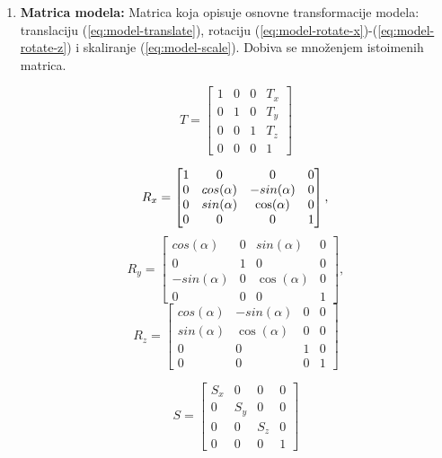 \begin{enumerate}
\item \textbf{Matrica modela:} Matrica koja opisuje osnovne transformacije modela: translaciju (\ref{eq:model-translate}), rotaciju (\ref{eq:model-rotate-x})-(\ref{eq:model-rotate-z}) i skaliranje (\ref{eq:model-scale}). Dobiva se množenjem istoimenih matrica.

\begin{equation}
\label{eq:model-translate}
	T = 
	\begin{bmatrix}
		1 & 0 & 0 & T_x\\
		0 & 1 & 0 & T_y\\
		0 & 0 & 1 & T_z\\
		0 & 0 & 0 & 1
	\end{bmatrix}
\end{equation}

\begin{equation}
\label{eq:model-rotate-x}
	R_x = 
	\begin{bmatrix}
		1 & 0 & 0 & 0\\
		0 & cos(\alpha) & -sin(\alpha) & 0\\
		0 & sin(\alpha) & \cos(\alpha) & 0\\
		0 & 0 & 0 & 1
	\end{bmatrix},\\
\end{equation}
\begin{equation}
\label{eq:model-rotate-y}
	R_y = 
	\begin{bmatrix}
		cos(\alpha) & 0 & sin(\alpha) & 0\\
		0 & 1 & 0 & 0\\
		-sin(\alpha) & 0 & \cos(\alpha) & 0\\
		0 & 0 & 0 & 1
	\end{bmatrix},
\end{equation}
\begin{equation}
\label{eq:model-rotate-z}
	R_z = 
	\begin{bmatrix}
		cos(\alpha) & -sin(\alpha) & 0 & 0\\
		sin(\alpha) & \cos(\alpha) & 0 & 0\\
		0 & 0 & 1 & 0\\
		0 & 0 & 0 & 1
	\end{bmatrix}
\end{equation}

\begin{equation}
\label{eq:model-scale}
	S = 
	\begin{bmatrix}
		S_x & 0 & 0 & 0\\
		0 & S_y & 0 & 0\\
		0 & 0 & S_z & 0\\
		0 & 0 & 0 & 1
	\end{bmatrix}
\end{equation}


\end{enumerate}
